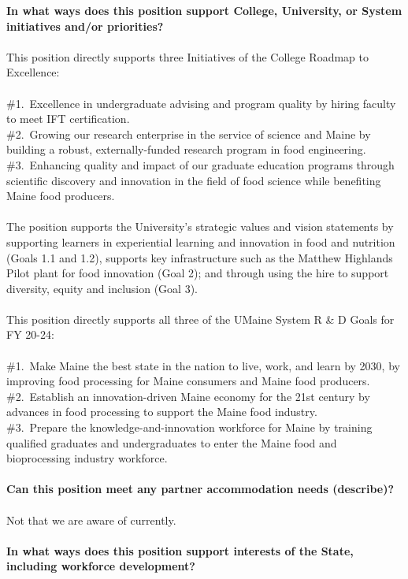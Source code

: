 \documentclass[11pt]{article}
\begin{document}
\newpage
\noindent\textbf{\rmfamily In what ways does this position support College, University, or System initiatives and/or priorities?}
\\~\\
This position directly supports three Initiatives of the College Roadmap to Excellence:\\~\\
\#1.~Excellence in undergraduate advising and program quality by hiring faculty to meet IFT certification.\\
\#2.~Growing our research enterprise in the service of science and Maine by building a robust, externally-funded research program in food engineering.\\
\#3.~Enhancing quality and impact of our graduate education programs through scientific discovery and innovation in the field of food science while benefiting Maine food producers.
\\~\\
The position supports the University's strategic values and vision statements by supporting learners in experiential learning and innovation in food and nutrition (Goals 1.1 and 1.2), supports key infrastructure such as the Matthew Highlands Pilot plant for food innovation (Goal 2); and through using the hire to support diversity, equity and inclusion (Goal 3).
\\~\\
This position directly supports all three of the UMaine System R \& D Goals for FY 20-24:\\~\\
\#1.~Make Maine the best state in the nation to live, work, and learn by 2030, by improving food processing for Maine consumers and Maine food producers. \\
\#2.~Establish an innovation-driven Maine economy for the 21st century by advances in food processing to support the Maine food industry.\\
\#3.~Prepare the knowledge-and-innovation workforce for Maine by training qualified graduates and undergraduates to enter the Maine food and bioprocessing industry workforce.\\~\\
\vfill
\noindent\textbf{\rmfamily Can this position meet any partner accommodation needs (describe)?}
\\~\\Not that we are aware of currently.\\~\\
\vfill
\noindent\textbf{\rmfamily In what ways does this position support interests of the State, including workforce development?}\\~\\
\end{document}

